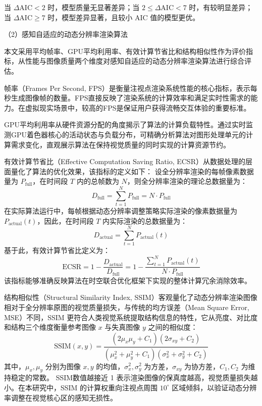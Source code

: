 当 $\Delta \text{AIC} < 2$ 时，模型质量无显著差异；当 $2 \le \Delta\text{AIC} < 7$ 时，有较明显差异；当 $\Delta\text{AIC} \ge 7$ 时，模型差异显著，且较小 AIC 值的模型更优。

（2）感知自适应的动态分辨率渲染算法

本文采用平均帧率、GPU平均利用率、有效计算节省比和结构相似性作为评价指标，从性能与图像质量两个维度对感知自适应的动态分辨率渲染算法进行综合评估。

帧率（Frames Per Second, FPS）是衡量注视点渲染系统性能的核心指标，表示每秒生成图像帧的数量。FPS直接反映了渲染系统的计算效率和满足实时性需求的能力。在虚拟现实场景中，较高的FPS是保证用户获得流畅交互体验的重要标准。

GPU平均利用率从硬件资源分配的角度揭示了算法的计算负载特性。通过实时监测GPU着色器核心的活动状态与负载分布，可精确分析算法对图形处理单元的计算需求变化，直观展示算法在保持视觉质量的同时实现的计算资源节约。

有效计算节省比（Effective Computation Saving Ratio, ECSR）从数据处理的层面量化了算法的优化效果，该指标的定义如下：
设全分辨率渲染的每帧像素数据量为 \(P_{\text{full}}\)，在时间段 \(T\) 内的总帧数为 \(N\)，则全分辨率渲染的理论总数据量为：
\begin{equation}
D_{\text{full}} = \sum_{t=1}^{N} P_{\text{full}} = N \cdot P_{\text{full}}
\label{eq:full_data}
\end{equation}
在实际算法运行中，每帧根据动态分辨率调整策略实际渲染的像素数据量为 \(P_{\text{actual}}(t)\)，因此，在时间段 \(T\) 内实际渲染的总数据量为：
\begin{equation}
D_{\text{actual}} = \sum_{t=1}^{N} P_{\text{actual}}(t)
\label{eq:actual_total_data}
\end{equation}
基于此，有效计算节省比定义为：
\begin{equation}
\text{ECSR} = 1 - \frac{D_{\text{actual}}}{D_{\text{full}}} = 1 - \frac{\sum_{t=1}^{N} P_{\text{actual}}(t)}{N \cdot P_{\text{full}}}
\label{eq:ecsr}
\end{equation}
该指标能够准确反映算法在时空联合优化框架下实现的整体计算冗余消除效率。

结构相似性（Structural Similarity Index, SSIM）客观量化了动态分辨率渲染图像相对于全分辨率原图的视觉质量损失，与传统的均方误差（Mean Square Error, MSE）不同，SSIM 更符合人类视觉系统提取结构信息的特性，它从亮度、对比度和结构三个维度衡量参考图像 $x$ 与失真图像 $y$ 之间的相似度：
\begin{equation}
\text{SSIM}(x, y) = \frac{(2\mu_x \mu_y + C_1)(2\sigma_{xy} + C_2)}{(\mu_x^2 + \mu_y^2 + C_1)(\sigma_x^2 + \sigma_y^2 + C_2)}
\label{eq:ssim}
\end{equation}
其中，$\mu_x, \mu_y$ 分别为图像 $x, y$ 的均值，$\sigma_x^2, \sigma_y^2$ 为方差，$\sigma_{xy}$ 为协方差，$C_1, C_2$ 为维持稳定的常数。
SSIM数值越接近 1 表示渲染图像的保真度越高，视觉质量损失越小。在本研究中，SSIM 的计算权重向注视点周围 $10^\circ$ 区域倾斜，以验证动态分辨率调整在视觉核心区的感知无损性。

